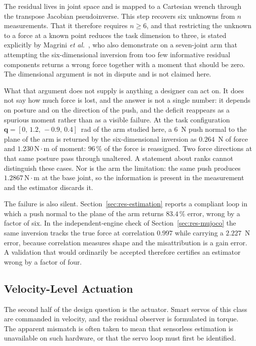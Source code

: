 \documentclass{ieeeaccess}
\begin{document}
The residual lives in joint space and is mapped to a Cartesian wrench through the
transpose Jacobian pseudoinverse. This step recovers six unknowns from $n$
measurements. That it therefore requires $n\ge6$, and that restricting the unknown
to a force at a known point reduces the task dimension to three, is stated
explicitly by Magrini \emph{et al.}~\cite{magrini2014virtual}, who also demonstrate
on a seven-joint arm that attempting the six-dimensional inversion from too few
informative residual components returns a wrong force together with a moment that
should be zero. The dimensional argument is not in dispute and is not claimed here.

What that argument does not supply is anything a designer can act on. It does not
say how much force is lost, and the answer is not a single number: it depends on
posture and on the direction of the push, and the deficit reappears as a spurious
moment rather than as a visible failure. At the task configuration
$\bm q=[0,\,1.2,\,-0.9,\,0.4]$~rad of the arm studied here, a $6$~N push normal to
the plane of the arm is returned by the six-dimensional inversion as $0.264$~N of
force and $1.230\,\mathrm{N}\cdot\mathrm{m}$ of moment: $96\,\%$ of the force is
reassigned. Two force directions at that same posture pass through unaltered. A
statement about ranks cannot distinguish these cases. Nor is the arm the
limitation: the same push produces $1.2867\,\mathrm{N}\cdot\mathrm{m}$ at the base
joint, so the information is present in the measurement and the estimator discards
it.

The failure is also silent. Section~\ref{sec:res-estimation} reports a compliant
loop in which a push normal to the plane of the arm returns $83.4\,\%$ error, wrong
by a factor of six. In the independent-engine check of
Section~\ref{sec:res-mujoco} the same inversion tracks the true force at
correlation $0.997$ while carrying a $2.227$~N error, because correlation measures
shape and the misattribution is a gain error. A validation that would ordinarily
be accepted therefore certifies an estimator wrong by a factor of four.

\subsection{Velocity-Level Actuation}
The second half of the design question is the actuator. Smart servos of this class
are commanded in velocity, and the residual observer is formulated in torque. The
apparent mismatch is often taken to mean that sensorless estimation is unavailable
on such hardware, or that the servo loop must first be identified.
\end{document}

